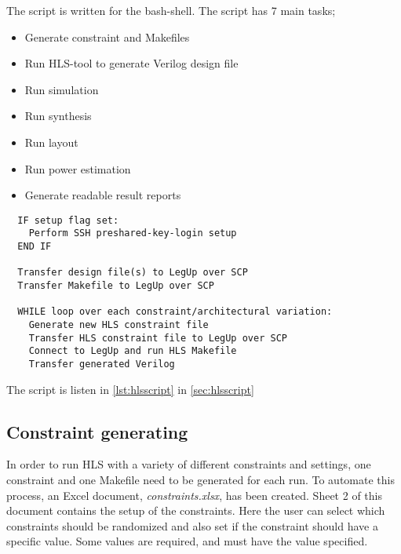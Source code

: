 The script is written for the bash-shell. The script has 7 main tasks; 
\begin{itemize}
    \item Generate constraint and Makefiles
    \item Run HLS-tool to generate Verilog design file
    \item Run simulation
    \item Run synthesis
    \item Run layout
    \item Run power estimation
    \item Generate readable result reports
\end{itemize}

\begin{verbatim}
  IF setup flag set:
    Perform SSH preshared-key-login setup
  END IF
  
  Transfer design file(s) to LegUp over SCP
  Transfer Makefile to LegUp over SCP
  
  WHILE loop over each constraint/architectural variation:
    Generate new HLS constraint file
    Transfer HLS constraint file to LegUp over SCP
    Connect to LegUp and run HLS Makefile
    Transfer generated Verilog
\end{verbatim}

The script is listen in \cref{lst:hlsscript} in \cref{sec:hlsscript}

\subsection{Constraint generating}
In order to run HLS with a variety of different constraints and settings, one constraint and one Makefile need to be generated for each run. To automate this process, an Excel document, \textit{constraints.xlsx}, has been created. Sheet 2 of this document contains the setup of the constraints. Here the user can select which constraints should be randomized and also set if the constraint should have a specific value. Some values are required, and must have the value specified.